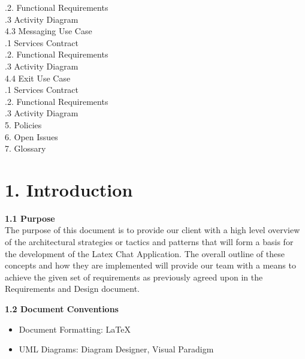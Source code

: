 \documentclass[29pt,a4paper]{moderncv}
\begin{document}
\begin{tabbing}
.2. Functional Requirements \\
.3 Activity Diagram \\
4.3 Messaging Use Case \> \\
.1 Services Contract \\
.2. Functional Requirements \\
.3 Activity Diagram \\
4.4 Exit Use Case \> \\
.1 Services Contract \\
.2. Functional Requirements \\
.3 Activity Diagram \\
5. Policies \> 			\\					
6. Open Issues \> 			\\				
7. Glossary \>  			\\				

\end{tabbing}
\newpage
	\section*{\textbf{1. Introduction}}
	\vspace{4mm}
	
		\textbf{1.1 Purpose}
			\\The purpose of this document is to provide our client with a high level overview of the architectural strategies or tactics and patterns that will form a basis for the development of the Latex Chat Application. The overall outline of these concepts and how they are implemented will provide our team with a means to achieve the given set of requirements as previously agreed upon in the Requirements and Design document.\\
		\vspace{1mm}
		
		\noindent \textbf{1.2 Document Conventions}
			\begin{itemize}
				\item Document Formatting: LaTeX
				\item UML Diagrams: Diagram Designer, Visual Paradigm
			\end{itemize}
		\vspace{5mm}
		
\end{document}
